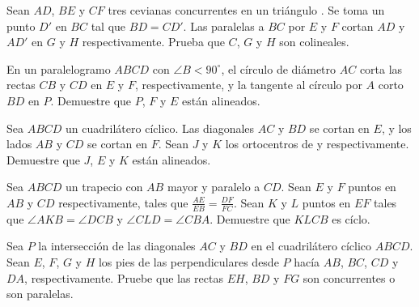 \begin{section-problem}
    Sean $AD$, $BE$ y $CF$ tres cevianas concurrentes en un triángulo .
    Se toma un punto $D'$ en $BC$ tal que $BD = CD'$.
    Las paralelas a $BC$ por $E$ y $F$ cortan $AD$ y $AD'$ en $G$ y $H$ respectivamente.
    Prueba que $C$, $G$ y $H$ son colineales.
\end{section-problem}

\begin{section-problem}
    En un paralelogramo $ABCD$ con $\angle B < 90^\circ$, el círculo de diámetro $AC$ corta las rectas $CB$ y $CD$ en $E$ y $F$, respectivamente, y la tangente al círculo por $A$ corto $BD$ en $P$.
    Demuestre que $P$, $F$ y $E$ están alineados.
\end{section-problem}

\begin{section-problem}
    Sea $ABCD$ un cuadrilátero cíclico.
    Las diagonales $AC$ y $BD$ se cortan en $E$, y los lados $AB$ y $CD$ se cortan en $F$.
    Sean $J$ y $K$ los ortocentros de  y  respectivamente.
    Demuestre que $J$, $E$ y $K$ están alineados.
\end{section-problem}

\begin{section-problem}
    Sea $ABCD$ un trapecio con $AB$ mayor y paralelo a $CD$.
    Sean $E$ y $F$ puntos en $AB$ y $CD$ respectivamente, tales que $\frac{AE}{EB} = \frac{DF}{FC}$.
    Sean $K$ y $L$ puntos en $EF$ tales que $\angle AKB = \angle DCB$ y $\angle CLD = \angle CBA$.
    Demuestre que $KLCB$ es cíclo.
\end{section-problem}

\begin{section-problem}
    Sea $P$ la intersección de las diagonales $AC$ y $BD$ en el cuadrilátero cíclico $ABCD$.
    Sean $E$, $F$, $G$ y $H$ los pies de las perpendiculares desde $P$ hacía $AB$, $BC$, $CD$ y $DA$, respectivamente.
    Pruebe que las rectas $EH$, $BD$ y $FG$ son concurrentes o son paralelas.
\end{section-problem}
